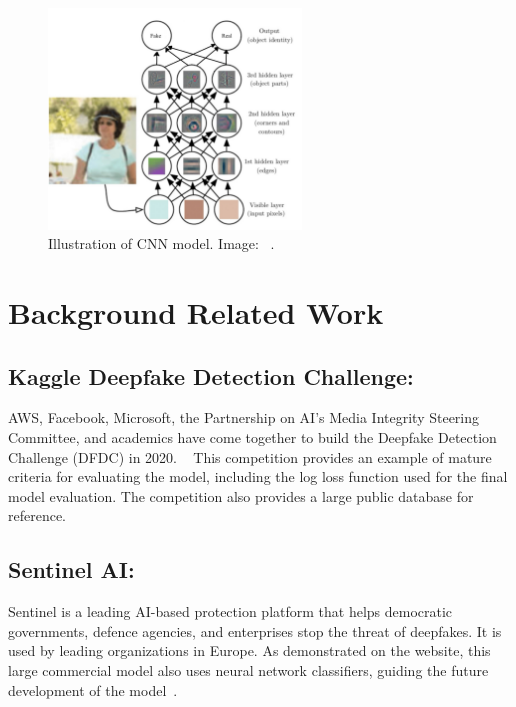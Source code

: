 \documentclass{article} %
\begin{document}
\begin{figure}[h]
\begin{center}
\includegraphics[width=0.6\textwidth]{Figs/cnn.jpg}
\end{center}
\caption{Illustration of CNN model. Image: ~\citep{Mandal_2024}.}
\end{figure}

\section{Background Related Work}
\label{others}

\subsection{Kaggle Deepfake Detection Challenge:}

AWS, Facebook, Microsoft, the Partnership on AI’s Media Integrity Steering Committee, and academics have come together to build the Deepfake Detection Challenge (DFDC) in 2020. ~\citep{Kaggle_DFDC} This competition provides an example of mature criteria for evaluating the model, including the log loss function used for the final model evaluation. The competition also provides a large public database for reference.

\subsection{Sentinel AI:}

Sentinel is a leading AI-based protection platform that helps democratic governments, defence agencies, and enterprises stop the threat of deepfakes. It is used by leading organizations in Europe.  As demonstrated on the website, this large commercial model also uses neural network classifiers, guiding the future development of the model~\citep{Sentinel}.
\end{document}
